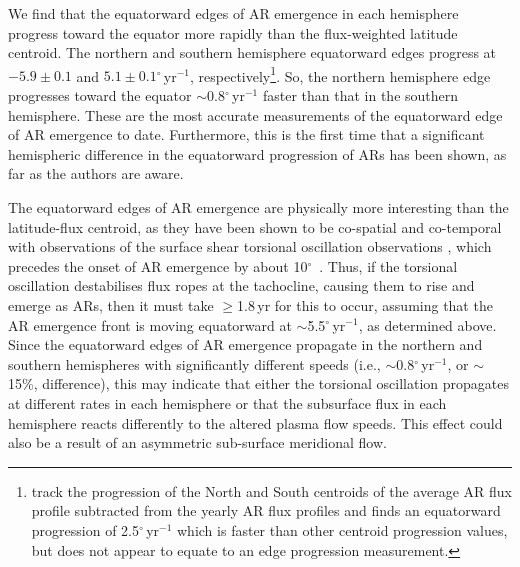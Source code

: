 \documentclass[namedreferences]{solarphysics}
\newcommand{\degr}{\ensuremath{^\circ}}
\begin{document}
\begin{article}
We find that the equatorward edges of AR emergence in each hemisphere progress toward the equator more rapidly than the flux-weighted latitude centroid. The northern and southern hemisphere equatorward edges progress at $-5.9\pm0.1$ and $5.1\pm0.1$\degr\,yr$^{-1}$, respectively\footnote{\citet{jin:2012} track the progression of the North and South centroids of the average AR flux profile subtracted from the yearly AR flux profiles and finds an equatorward progression of 2.5\degr\,yr$^{-1}$ which is faster than other centroid progression values, but does not appear to equate to an edge progression measurement.}. So, the northern hemisphere edge progresses toward the equator $\sim$0.8\degr\,yr$^{-1}$ faster than that in the southern hemisphere. These are the most accurate measurements of the equatorward edge of AR emergence to date. Furthermore, this is the first time that a significant hemispheric difference in the equatorward progression of ARs has been shown, as far as the authors are aware.

The equatorward edges of AR emergence are physically more interesting than the latitude-flux centroid, as they have been shown to be co-spatial and co-temporal with observations of the surface shear torsional oscillation observations \citep{Howe:2011}, which precedes the onset of AR emergence by about 10\degr\ \citep{Haber:2002}. Thus, if the torsional oscillation destabilises flux ropes at the tachocline, causing them to rise and emerge as ARs, then it must take $\ge$1.8\,yr for this to occur, assuming that the AR emergence front is moving equatorward at $\sim$5.5\degr\,yr$^{-1}$, as determined above. Since the equatorward edges of AR emergence propagate in the northern and southern hemispheres with significantly different speeds (i.e., $\sim$0.8\degr\,yr$^{-1}$, or $\sim$15\%, difference), this may indicate that either the torsional oscillation propagates at different rates in each hemisphere or that the subsurface flux in each hemisphere reacts differently to the altered plasma flow speeds. This effect could also be a result of an asymmetric sub-surface meridional flow.



\end{article}
\end{document}
